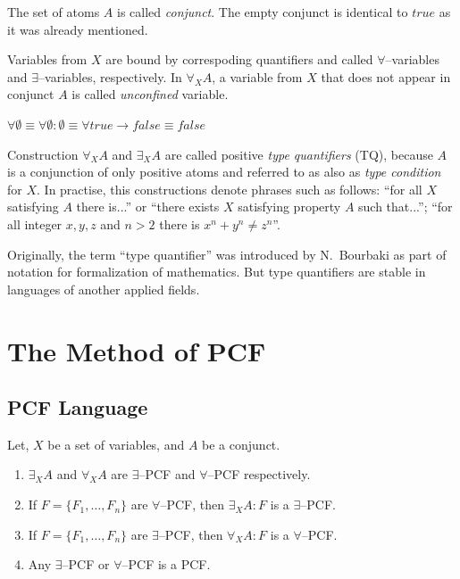 \documentclass[runningheads,a4paper]{llncs}
\begin{document}
The set of atoms $A$ is called {\em conjunct}. The empty conjunct is identical to $true$ as it was already mentioned.

Variables from $X$ are bound by correspoding quantifiers and called $\forall$--variables and $\exists$--variables, respectively. In $\forall_XA$, a variable from $X$ that does not appear in conjunct $A$ is called {\em unconfined} variable.

$\forall \emptyset \equiv \forall \emptyset\colon\emptyset \equiv \forall true \rightarrow false \equiv false$

Construction $\forall_XA$ and $\exists_XA$ are called positive \emph{type quantifiers} (TQ), because $A$ is a conjunction of only positive atoms and referred to as also as \emph{type condition} for $X$. In practise, this constructions denote phrases such as follows: ``for all $X$ satisfying $A$ there is...'' or ``there exists $X$ satisfying property $A$ such that...''; ``for all integer $x,y,z$ and $n>2$ there is $x^n + y^n \ne z^n$''.

Originally, the term ``type quantifier'' was introduced by N.~Bourbaki \cite{Bourbaki} as part of notation for formalization of mathematics. But type quantifiers are stable in languages of another applied fields.

\section{The Method of PCF}

\subsection{PCF Language}

\begin{definition}
\label{def:pcf}
Let, $X$ be a set of variables, and $A$ be a conjunct.
\begin{enumerate}

\item $\exists_XA$ and $\forall_XA$ are $\exists$--PCF and $\forall$--PCF respectively.

\item If $F = \{F_1,\ldots,F_n\}$ are $\forall$--PCF, then $\exists_XA\colon F$ is a $\exists$--PCF.

\item If $F = \{F_1,\ldots,F_n\}$ are $\exists$--PCF, then $\forall_XA\colon F$ is a $\forall$--PCF.

\item Any $\exists$--PCF or $\forall$--PCF is a PCF.
\end{enumerate}
\end{definition}
\end{document}
